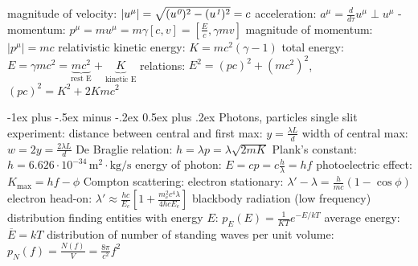 \documentclass[10pt,landscape]{article}
\makeatletter
\renewcommand{\subsection}{\@startsection{subsection}{2}{0mm}%
                                {-1ex plus -.5ex minus -.2ex}%
                                {0.5ex plus .2ex}%
                                {\normalfont\normalsize\bfseries}}
\newcommand{\spc}{\hspace*{1em}}
\makeatother
\begin{document}
\begin{multicols*}{3}
\newline
\spc magnitude of velocity: $|u^{\mu}|=\sqrt{(u^{\emph{0}})^2-(u^{\emph{1}})^2}=c$
\newline
acceleration: $a^{\mu}=\frac{d}{d\tau}u^{\mu}\perp u^{\mu}$
-momentum: $p^{\mu}=mu^{\mu}=m\gamma[c,v]=[\frac{E}{c},\gamma mv]$
\newline
\spc magnitude of momentum: $|p^\mu|=mc$
\newline
relativistic kinetic energy: $K=mc^2(\gamma -1)$
\newline
\spc total energy: $E=\gamma mc^2=\underbrace{mc^2}_{\textrm{rest E}}+\underbrace{K}_{\textrm{kinetic E}}$
\newline
\spc relations: $E^2=(pc)^2+(mc^2)^2$, $(pc)^2=K^2+2Kmc^2$


\subsection{Photons, particles}
single slit experiment: 
\newline
\spc distance between central and first max: $y=\frac{\lambda L}{d}$
\newline
\spc width of central max: $w=2y=\frac{2\lambda L}{d}$
\newline
De Braglie relation: $h=\lambda p=\lambda \sqrt{2mK}$
\newline
Plank's constant: $h=6.626\cdot 10^{-34}\,\mathrm{m}^2\cdot\textrm{kg}/\textrm{s}$
\newline
energy of photon: $E=cp=c\frac{h}{\lambda}=hf$
\newline
photoelectric effect: $K_{\mathrm{max}}=hf-\phi$
\newline
Compton scattering:
\newline
\spc electron stationary: $\lambda '-\lambda=\frac{h}{mc}(1-\cos\phi)$
\newline
\spc electron head-on: $\lambda '\approx \frac{hc}{E_e}\left [ 1+\frac{m_e^2c^4\lambda}{4hcE_e} \right ]$
\newline
blackbody radiation (low frequency)
\newline
\spc distribution finding entities with energy $E$:
\newline
\spc \spc$p_E(E)=\frac{1}{KT}e^{-E/kT}$
\newline
\spc \spc average energy: $\overline{E}=kT$
\newline
\spc distribution of number of standing waves per unit volume:
\newline
\spc \spc $p_N(f)=\frac{N(f)}{V}=\frac{8\pi}{c^2}f^2$

\end{multicols*}
\end{document}
